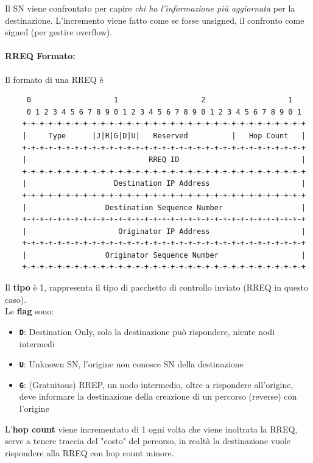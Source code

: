 Il SN viene confrontato per capire \textit{chi ha l'informazione più aggiornata} per la destinazione. L'incremento viene fatto come se fosse unsigned, il confronto come signed (per gestire overflow).\\

\newpage

\paragraph{RREQ Formato:} Il formato di una RREQ è 
\begin{verbatim}
	 0                   1                   2                   1
	 0 1 2 3 4 5 6 7 8 9 0 1 2 3 4 5 6 7 8 9 0 1 2 3 4 5 6 7 8 9 0 1
	+-+-+-+-+-+-+-+-+-+-+-+-+-+-+-+-+-+-+-+-+-+-+-+-+-+-+-+-+-+-+-+-+
	|     Type      |J|R|G|D|U|   Reserved          |   Hop Count   |
	+-+-+-+-+-+-+-+-+-+-+-+-+-+-+-+-+-+-+-+-+-+-+-+-+-+-+-+-+-+-+-+-+
	|                            RREQ ID                            |
	+-+-+-+-+-+-+-+-+-+-+-+-+-+-+-+-+-+-+-+-+-+-+-+-+-+-+-+-+-+-+-+-+
	|                    Destination IP Address                     |
	+-+-+-+-+-+-+-+-+-+-+-+-+-+-+-+-+-+-+-+-+-+-+-+-+-+-+-+-+-+-+-+-+
	|                  Destination Sequence Number                  |
	+-+-+-+-+-+-+-+-+-+-+-+-+-+-+-+-+-+-+-+-+-+-+-+-+-+-+-+-+-+-+-+-+
	|                     Originator IP Address                     |
	+-+-+-+-+-+-+-+-+-+-+-+-+-+-+-+-+-+-+-+-+-+-+-+-+-+-+-+-+-+-+-+-+
	|                  Originator Sequence Number                   |
	+-+-+-+-+-+-+-+-+-+-+-+-+-+-+-+-+-+-+-+-+-+-+-+-+-+-+-+-+-+-+-+-+
\end{verbatim}

Il \textbf{tipo} è 1, rappresenta il tipo di pacchetto di controllo inviato (RREQ in questo caso).\\

Le \textbf{flag} sono: 
\begin{itemize}
	\item \textbf{\texttt{D}}: Destination Only, solo la destinazione può rispondere, niente nodi intermedi
	\item \textbf{\texttt{U}}: Unknown SN, l'origine non conosce SN della destinazione
	\item \textbf{\texttt{G}}: (Gratuitous) RREP, un nodo intermedio, oltre a rispondere all'origine, deve informare la destinazione della creazione di un percorso (reverse) con l'origine
\end{itemize}

L'\textbf{hop count} viene incrementato di 1 ogni volta che viene inoltrata la RREQ, serve a tenere traccia del "costo" del percorso, in realtà la destinazione vuole rispondere alla RREQ con hop count minore.\\

